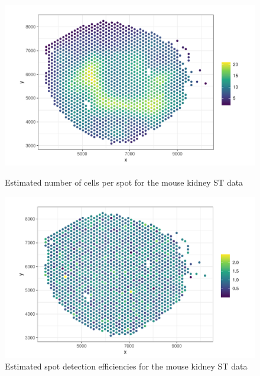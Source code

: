 \documentclass{article}\usepackage[]{graphicx}\usepackage[]{xcolor}
\makeatletter
\def\maxwidth{ %
  \ifdim\Gin@nat@width>\linewidth
    \linewidth
  \else
    \Gin@nat@width
  \fi
}
\newenvironment{knitrout}{}{} %
\makeatother
\begin{document}
\begin{figure}[h]
\begin{minipage}[c]{0.5\textwidth}
\begin{knitrout}
\color{fgcolor}

{\centering \includegraphics[width=\maxwidth]{plots/pc7-1} 

}


\end{knitrout}
  \caption{Estimated number of cells per spot for the mouse kidney ST data}
\label{f:ncells_mkc}
\end{minipage}
\hfill
\begin{minipage}[c]{0.5\textwidth}
\begin{knitrout}
\color{fgcolor}

{\centering \includegraphics[width=\maxwidth]{plots/pc8-1} 

}


\end{knitrout}
  \caption{Estimated spot detection efficiencies for the mouse kidney ST data}
\label{f:sde_mkc}
\end{minipage}
\end{figure}
\end{document}
